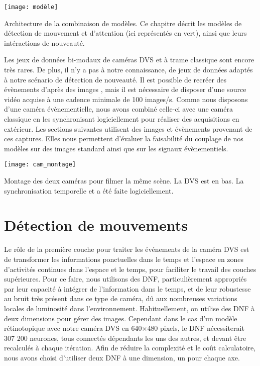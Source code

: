 	\begin{figureth}
		\begin{subfigureth}{\textwidth}
			\texttt{[image: modèle]}
		\end{subfigureth}
		\caption[Architecture de la combinaison de modèles]{Architecture de la combinaison de modèles. Ce chapitre décrit les modèles de détection de mouvement et d'attention (ici représentés en vert), ainsi que leurs intéractions de nouveauté.}\label{fig:archi}
	\end{figureth}

	Les jeux de données bi-modaux de caméras DVS et à trame classique sont encore très rares. De plus, il n'y a pas à notre connaissance, de jeux de données adaptés à notre scénario de détection de nouveauté. Il est possible de recréer des évènements d'après des images \cite{hu2021v2e}, mais il est nécessaire de disposer d'une source vidéo acquise à une cadence minimale de 100 images/s. Comme nous disposons d'une caméra évènementielle, nous avons combiné celle-ci avec une caméra classique en les synchronisant logiciellement pour réaliser des acquisitions en extérieur. Les sections suivantes utilisent des images et évènements provenant de ces captures. Elles nous permettent d'évaluer la faisabilité du couplage de nos modèles sur des images standard ainsi que sur les signaux évènementiels.

	\begin{figureth}
		\begin{subfigureth}{\textwidth}
			\texttt{[image: cam\_montage]}
		\end{subfigureth}
		\caption[Montage des deux caméras]{Montage des deux caméras pour filmer la même scène. La DVS est en bas. La synchronisation temporelle et a été faite logiciellement.}\label{fig:cam}
	\end{figureth}

	\newpage

	\section{Détection de mouvements}

	Le rôle de la première couche pour traiter les événements de la caméra DVS est de transformer les informations ponctuelles dans le temps et l'espace en zones d'activités continues dans l'espace et le temps, pour faciliter le travail des couches supérieures. Pour ce faire, nous utilisons des DNF, particulièrement appropriés par leur capacité à intégrer de l'information dans le temps, et de leur robustesse au bruit très présent dans ce type de caméra, dû aux nombreuses variations locales de luminosité dans l'environnement. Habituellement, on utilise des DNF à deux dimensions pour gérer des images. Cependant dans le cas d'un modèle rétinotopique avec notre caméra DVS en 640$\times$480 pixels, le DNF nécessiterait 307 200 neurones, tous connectés dépendants les uns des autres, et devant être recalculés à chaque itération. Afin de réduire la complexité et le coût calculatoire, nous avons choisi d'utiliser deux DNF à une dimension, un pour chaque axe.

